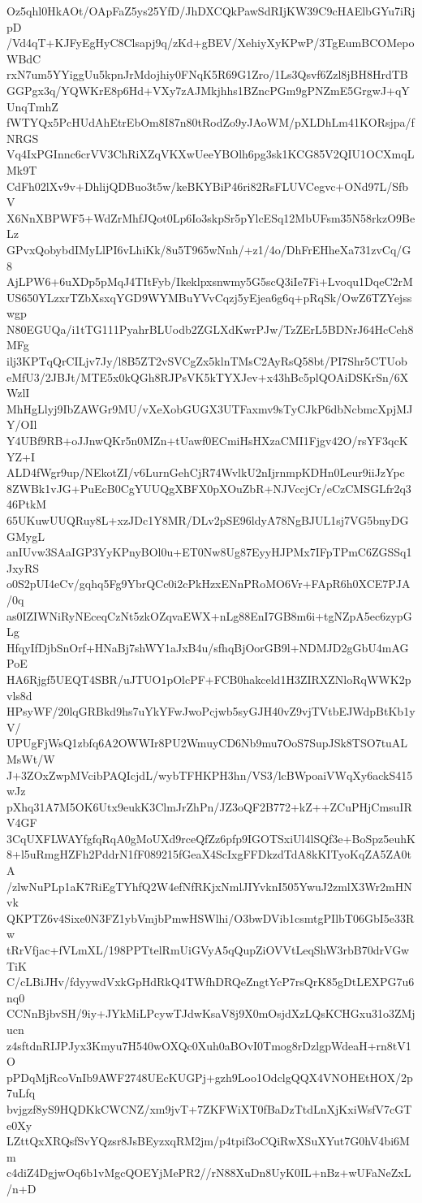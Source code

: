 Oz5qhl0HkAOt/OApFaZ5ys25YfD/JhDXCQkPawSdRIjKW39C9cHAElbGYu7iRjpD
/Vd4qT+KJFyEgHyC8Clsapj9q/zKd+gBEV/XehiyXyKPwP/3TgEumBCOMepoWBdC
rxN7um5YYiggUu5kpnJrMdojhiy0FNqK5R69G1Zro/1Ls3Qsvf6Zzl8jBH8HrdTB
GGPgx3q/YQWKrE8p6Hd+VXy7zAJMkjhhs1BZncPGm9gPNZmE5GrgwJ+qYUnqTmhZ
fWTYQx5PcHUdAhEtrEbOm8I87n80tRodZo9yJAoWM/pXLDhLm41KORsjpa/fNRGS
Vq4IxPGInnc6crVV3ChRiXZqVKXwUeeYBOlh6pg3sk1KCG85V2QIU1OCXmqLMk9T
CdFh02lXv9v+DhlijQDBuo3t5w/keBKYBiP46ri82RsFLUVCegvc+ONd97L/SfbV
X6NnXBPWF5+WdZrMhfJQot0Lp6Io3skpSr5pYlcESq12MbUFsm35N58rkzO9BeLz
GPvxQobybdIMyLlPI6vLhiKk/8u5T965wNnh/+z1/4o/DhFrEHheXa731zvCq/G8
AjLPW6+6uXDp5pMqJ4TItFyb/Ikeklpxsnwmy5G5scQ3iIe7Fi+Lvoqu1DqeC2rM
US650YLzxrTZbXsxqYGD9WYMBuYVvCqzj5yEjea6g6q+pRqSk/OwZ6TZYejsswgp
N80EGUQa/i1tTG111PyahrBLUodb2ZGLXdKwrPJw/TzZErL5BDNrJ64HcCeh8MFg
ilj3KPTqQrCILjv7Jy/l8B5ZT2vSVCgZx5klnTMsC2AyRsQ58bt/PI7Shr5CTUob
eMfU3/2JBJt/MTE5x0kQGh8RJPsVK5kTYXJev+x43hBc5plQOAiDSKrSn/6XWzlI
MhHgLlyj9IbZAWGr9MU/vXeXobGUGX3UTFaxmv9sTyCJkP6dbNcbmcXpjMJY/OIl
Y4UBf9RB+oJJnwQKr5n0MZn+tUawf0ECmiHsHXzaCMI1Fjgv42O/rsYF3qcKYZ+I
ALD4fWgr9up/NEkotZI/v6LurnGehCjR74WvlkU2nIjrnmpKDHn0Leur9iiJzYpc
8ZWBk1vJG+PuEcB0CgYUUQgXBFX0pXOuZbR+NJVccjCr/eCzCMSGLfr2q346PtkM
65UKuwUUQRuy8L+xzJDc1Y8MR/DLv2pSE96ldyA78NgBJUL1sj7VG5bnyDGGMygL
anIUvw3SAaIGP3YyKPnyBOl0u+ET0Nw8Ug87EyyHJPMx7IFpTPmC6ZGSSq1JxyRS
o0S2pUI4eCv/gqhq5Fg9YbrQCc0i2cPkHzxENnPRoMO6Vr+FApR6h0XCE7PJA/0q
as0IZIWNiRyNEceqCzNt5zkOZqvaEWX+nLg88EnI7GB8m6i+tgNZpA5ec6zypGLg
HfqyIfDjbSnOrf+HNaBj7shWY1aJxB4u/sfhqBjOorGB9l+NDMJD2gGbU4mAGPoE
HA6Rjgf5UEQT4SBR/uJTUO1pOlcPF+FCB0hakceld1H3ZIRXZNloRqWWK2pvls8d
HPsyWF/20lqGRBkd9hs7uYkYFwJwoPcjwb5syGJH40vZ9vjTVtbEJWdpBtKb1yV/
UPUgFjWsQ1zbfq6A2OWWIr8PU2WmuyCD6Nb9mu7OoS7SupJSk8TSO7tuALMsWt/W
J+3ZOxZwpMVcibPAQIcjdL/wybTFHKPH3hn/VS3/lcBWpoaiVWqXy6ackS415wJz
pXhq31A7M5OK6Utx9eukK3ClmJrZhPn/JZ3oQF2B772+kZ++ZCuPHjCmsuIRV4GF
3CqUXFLWAYfgfqRqA0gMoUXd9rceQfZz6pfp9IGOTSxiUl4lSQf3e+BoSpz5euhK
8+l5uRmgHZFh2PddrN1fF089215fGeaX4ScIxgFFDkzdTdA8kKITyoKqZA5ZA0tA
/zlwNuPLp1aK7RiEgTYhfQ2W4efNfRKjxNmlJIYvknI505YwuJ2zmlX3Wr2mHNvk
QKPTZ6v4Sixe0N3FZ1ybVmjbPmwHSWlhi/O3bwDVib1csmtgPIlbT06GbI5e33Rw
tRrVfjac+fVLmXL/198PPTtelRmUiGVyA5qQupZiOVVtLeqShW3rbB70drVGwTiK
C/cLBiJHv/fdyywdVxkGpHdRkQ4TWfhDRQeZngtYcP7rsQrK85gDtLEXPG7u6nq0
CCNnBjbvSH/9iy+JYkMiLPcywTJdwKsaV8j9X0mOsjdXzLQsKCHGxu31o3ZMjucn
z4sftdnRIJPJyx3Kmyu7H540wOXQc0Xuh0aBOvI0Tmog8rDzlgpWdeaH+rn8tV1O
pPDqMjRcoVnIb9AWF2748UEcKUGPj+gzh9Loo1OdclgQQX4VNOHEtHOX/2p7uLfq
bvjgzf8yS9HQDKkCWCNZ/xm9jvT+7ZKFWiXT0fBaDzTtdLnXjKxiWsfV7cGTe0Xy
LZttQxXRQsfSvYQzsr8JsBEyzxqRM2jm/p4tpif3oCQiRwXSuXYut7G0hV4bi6Mm
c4diZ4DgjwOq6b1vMgcQOEYjMePR2//rN88XuDn8UyK0IL+nBz+wUFaNeZxL/n+D
